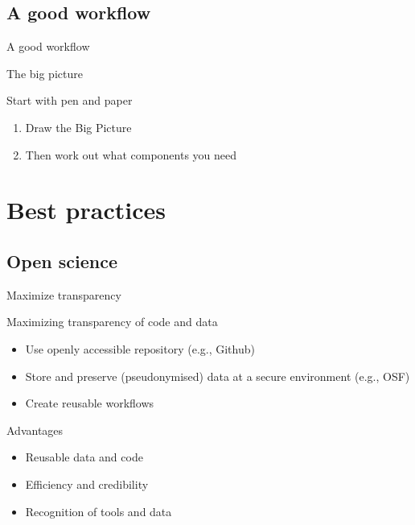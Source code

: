 \documentclass[handout]{beamer}
\begin{document}
\subsection{A good workflow}
\begin{frame}
	A good workflow
\end{frame}

\begin{frame}{The big picture}
\begin{block}{Start with pen and paper}
\begin{enumerate}[<+->]
	\item Draw the Big Picture
	\item Then work out what components you need
\end{enumerate}
\end{block}
\end{frame}

\section{Best practices}
\subsection{Open science}
\begin{frame}{Maximize transparency}
\begin{block}{Maximizing transparency of code and data}
	\begin{itemize}[<+->]
		\item Use openly accessible repository (e.g., Github)
		\item Store and preserve (pseudonymised) data at a secure environment (e.g., OSF)
		\item Create reusable workflows 
	\end{itemize}
\end{block}
\pause
\begin{exampleblock}{Advantages}
	\begin{itemize}[<+->]
		\item Reusable data and code
		\item Efficiency and credibility 
		\item Recognition of tools and data
	\end{itemize}
\end{exampleblock}

\end{frame}	
\end{document}
